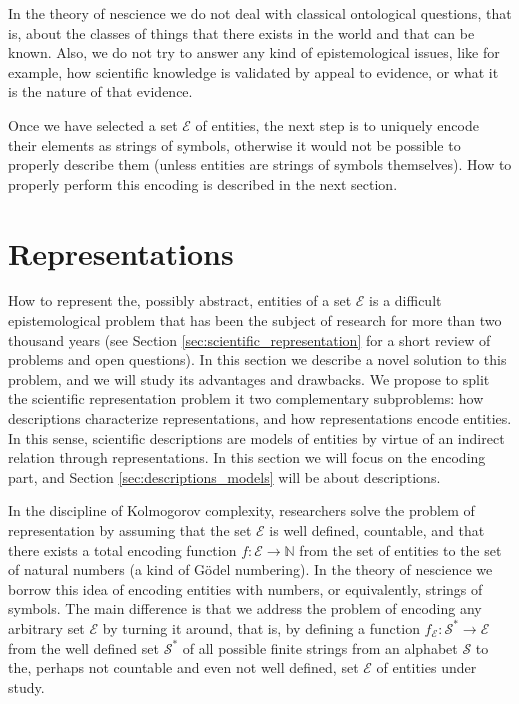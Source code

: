 In the theory of nescience we do not deal with classical ontological questions, that is, about the classes of things that there exists in the world and that can be known. Also, we do not try to answer any kind of epistemological issues, like for example, how scientific knowledge is validated by appeal to evidence, or what it is the nature of that evidence.

Once we have selected a set $\mathcal{E}$ of entities, the next step is to uniquely encode their elements as strings of symbols, otherwise it would not be possible to properly describe them (unless entities are strings of symbols themselves). How to properly perform this encoding is described in the next section.

%
%

\section{Representations}
\label{sec:representations}

How to represent the, possibly abstract, entities of a set $\mathcal{E}$ is a difficult epistemological problem that has been the subject of research for more than two thousand years (see Section \ref{sec:scientific_representation} for a short review of problems and open questions). In this section we describe a novel solution to this problem, and we will study its advantages and drawbacks. We propose to split the scientific representation problem it two complementary subproblems: how descriptions characterize representations, and how representations encode entities. In this sense, scientific descriptions are models of entities by virtue of an indirect relation through representations. In this section we will focus on the encoding part, and Section \ref{sec:descriptions_models} will be about descriptions.

In the discipline of Kolmogorov complexity, researchers solve the problem of representation by assuming that the set $\mathcal{E}$ is well defined, countable, and that there exists a total encoding function $f:\mathcal{E} \rightarrow \mathbb{N}$ from the set of entities to the set of natural numbers (a kind of Gödel numbering). In the theory of nescience we borrow this idea of encoding entities with numbers, or equivalently, strings of symbols. The main difference is that we address the problem of encoding any arbitrary set $\mathcal{E}$ by turning it around, that is, by defining a function $f_\mathcal{E}:\mathcal{S}^\ast \rightarrow \mathcal{E}$ from the well defined set $\mathcal{S}^\ast$ of all possible finite strings from an alphabet $\mathcal{S}$ to the, perhaps not countable and even not well defined, set $\mathcal{E}$ of entities under study.

